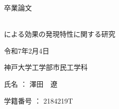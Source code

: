 \thispagestyle{empty}
\pagestyle{empty}
\begin{center}
\Huge{卒業論文}

\vspace*{1.5cm}

\Huge{ \\による効果の発現特性に関する研究}\\

\vspace*{5.5cm} %


\huge{令和\textsf{7}年\textsf{2}月\textsf{4}日}


\vspace*{0.5cm}

\huge{神戸大学工学部市民工学科}

\vspace*{1cm}

\huge{氏名 ： 澤田　遼}

\vspace*{0.5cm}

\huge{学籍番号 ： \textsf{2184219T}}


\end{center}